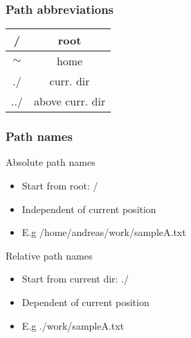 \documentclass[]{beamer}
\newcommand\Fontlarge{\fontsize{12}{30.4}\selectfont}
\begin{document}

\begin{frame}
\frametitle{Path abbreviations}

\Fontlarge

\begin{table}[h]
\begin{tabular}{cc}

/ & root \\ \hline
$\sim$ & home \\ \hline
./ & curr. dir \\ \hline
../ & above curr. dir \\ 
\end{tabular}
\end{table}

\end{frame}


\begin{frame}
\frametitle{Path names}

\begin{block}{Absolute path names}
\begin{itemize}
\item Start from root: /
\item Independent of current position
\item E.g /home/andreas/work/sampleA.txt
\end{itemize}
\end{block}

\pause

\begin{block}{Relative path names}
\begin{itemize}
\item Start from current dir: ./
\item Dependent of current position
\item E.g ./work/sampleA.txt
\end{itemize}
\end{block}

\end{frame}


\end{document}
